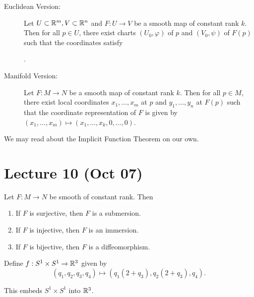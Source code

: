 \documentclass[twoside, 10pt]{article}
\begin{document}
    \begin{thm}
        \begin{description}
            \item[Euclidean Version:] Let $U \subset \mathbb{R}^m, V \subset \mathbb{R}^n$ and $F:U \to V$ be a smooth map of constant rank $k$. Then for all $p \in U$, there exist charts $(U_0, \varphi)$ of $p$ and $(V_0, \psi)$ of $F(p)$ such that the coordinates satisfy
                \begin{center}
                    .
                \end{center}
            \item[Manifold Version:] Let $F:M \to N$ be a smooth map of constant rank $k$. Then for all $p \in M$, there exist local coordinates $x_1, \ldots, x_m$ at $p$ and $y_1, \ldots, y_n$ at $F(p)$ such that the coordinate representation of $F$ is given by $(x_1, \ldots, x_m) \mapsto (x_1, \ldots, x_k, 0, \ldots, 0)$.
        \end{description}
    \end{thm}

    We may read about the Implicit Function Theorem on our own.

    \section{Lecture 10 (Oct 07)}%
    \label{sec:lecture_10_oct_07_}

    \begin{thm}
        Let $F:M \to N$ be smooth of constant rank. Then
        \begin{enumerate}
            \item If $F$ is surjective, then $F$ is a submersion.
            \item If $F$ is injective, then $F$ is an immersion.
            \item If $F$ is bijective, then $F$ is a diffeomorphism.
        \end{enumerate}
    \end{thm}

    \begin{exm}
        Define $f:S^1 \times S^1 \to \mathbb{R}^3$ given by
        \[ (q_1, q_2, q_3, q_4) \mapsto (q_1(2+q_3), q_2(2+q_3), q_4).\]

        This embeds $S^1 \times S^1$ into $\mathbb{R}^3$.
    \end{exm}
    
\end{document}

